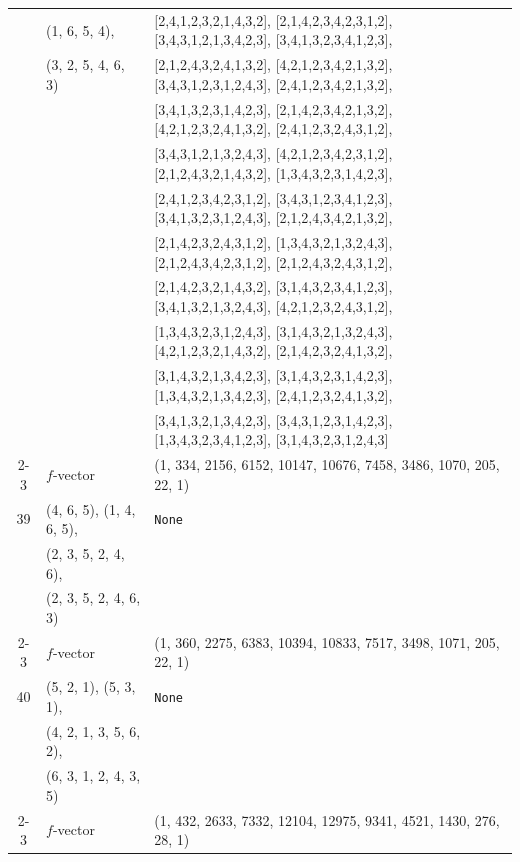 \documentclass[10pt]{amsart}
\numberwithin{equation}{section}
\theoremstyle{plain}
\theoremstyle{definition}
\theoremstyle{remark}
\begin{document}
{\begin{longtable}{c|l|l}
		& (1, 6, 5, 4), & [2,4,1,2,3,2,1,4,3,2], [2,1,4,2,3,4,2,3,1,2], [3,4,3,1,2,1,3,4,2,3], [3,4,1,3,2,3,4,1,2,3], \\
		& (3, 2, 5, 4, 6, 3) & [2,1,2,4,3,2,4,1,3,2], [4,2,1,2,3,4,2,1,3,2], [3,4,3,1,2,3,1,2,4,3], [2,4,1,2,3,4,2,1,3,2], \\
		&  & [3,4,1,3,2,3,1,4,2,3], [2,1,4,2,3,4,2,1,3,2], [4,2,1,2,3,2,4,1,3,2], [2,4,1,2,3,2,4,3,1,2], \\
		&  & [3,4,3,1,2,1,3,2,4,3], [4,2,1,2,3,4,2,3,1,2], [2,1,2,4,3,2,1,4,3,2], [1,3,4,3,2,3,1,4,2,3], \\
		&  & [2,4,1,2,3,4,2,3,1,2], [3,4,3,1,2,3,4,1,2,3], [3,4,1,3,2,3,1,2,4,3], [2,1,2,4,3,4,2,1,3,2], \\
		&  & [2,1,4,2,3,2,4,3,1,2], [1,3,4,3,2,1,3,2,4,3], [2,1,2,4,3,4,2,3,1,2], [2,1,2,4,3,2,4,3,1,2], \\
		&  & [2,1,4,2,3,2,1,4,3,2], [3,1,4,3,2,3,4,1,2,3], [3,4,1,3,2,1,3,2,4,3], [4,2,1,2,3,2,4,3,1,2], \\
		&  & [1,3,4,3,2,3,1,2,4,3], [3,1,4,3,2,1,3,2,4,3], [4,2,1,2,3,2,1,4,3,2], [2,1,4,2,3,2,4,1,3,2], \\
		&  & [3,1,4,3,2,1,3,4,2,3], [3,1,4,3,2,3,1,4,2,3], [1,3,4,3,2,1,3,4,2,3], [2,4,1,2,3,2,4,1,3,2], \\
		&  & [3,4,1,3,2,1,3,4,2,3], [3,4,3,1,2,3,1,4,2,3], [1,3,4,3,2,3,4,1,2,3], [3,1,4,3,2,3,1,2,4,3] \\ \cline{2-3}
		
		& $f$-vector & {(1, 334, 2156, 6152, 10147, 10676, 7458, 3486, 1070, 205, 22, 1)} \\
		\midrule
		
		39 & (4, 6, 5), (1, 4, 6, 5), & \texttt{None} \\
		& (2, 3, 5, 2, 4, 6), &  \\
		& (2, 3, 5, 2, 4, 6, 3) &  \\ \cline{2-3}
		
		& $f$-vector & {(1, 360, 2275, 6383, 10394, 10833, 7517, 3498, 1071, 205, 22, 1)} \\
		\midrule
		
		40 & (5, 2, 1), (5, 3, 1), & \texttt{None} \\
		& (4, 2, 1, 3, 5, 6, 2), &  \\
		& (6, 3, 1, 2, 4, 3, 5) &  \\ \cline{2-3}
		
		& $f$-vector & {(1, 432, 2633, 7332, 12104, 12975, 9341, 4521, 1430, 276, 28, 1)} \\
		\midrule
		

\end{longtable}}
\end{document}
